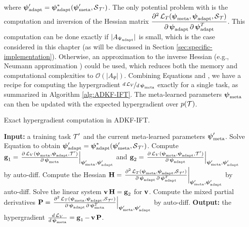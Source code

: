     where $\psiml'=\psiml^*(\psimeta',\support_{\task'})$.
    The only potential problem with 
    is the computation and inversion of the Hessian matrix $\displaystyle \frac{\partial^2\loss_T(\psimeta,\psiml,\support_{\task} )}{\partial\psiml\partial\psiml^T}$.
    This computation can be done exactly if $|A_{\Psiml}|$ is small, which is the case considered in this chapter (as will be discussed in Section \ref{sec:specific-implementation}).
    Otherwise, an approximation to the inverse Hessian (e.g., Neumann approximation \citep{lorraine20a,clarke2022scalable}) could be used, which reduces both the memory and computational complexities to $\mathcal{O}(|A_{\Psi}|)$.
    Combining Equations  and , we have a recipe for computing the hypergradient $\nicefrac{d\loss_V}{d\psimeta}$ exactly for a single task, as summarized in Algorithm \ref{alg:ADKF-IFT}. The meta-learned parameters $\psimeta$ can then be updated with the expected hypergradient over $p(\task)$.
    
    \begin{algorithm}[tbh]
    \small
    \caption{Exact hypergradient computation in ADKF-IFT.}\label{alg:ADKF-IFT}
    \begin{algorithmic}[1]
        \STATE \textbf{Input:} a training task $\task'$ and the current meta-learned parameters $\psimeta'$.
        \vspace{1ex}
        \STATE Solve Equation  to obtain $\psiml'=\psiml^*(\psimeta',\support_{\task'})$.
        \STATE Compute $\bfg_1=\left.\frac{\partial \loss_V(\psimeta,\psiml,\task' )}{\partial\psimeta}\right\vert_{\psimeta',\psiml'}$ and $\bfg_2=\left.\frac{\partial \loss_V(\psimeta,\psiml,\task' )}{\partial \psiml}\right\vert_{\psimeta',\psiml'}$ by auto-diff.
        \STATE Compute the Hessian $\bfH=\left. \frac{\partial^2\loss_T(\psimeta,\psiml,\support_{\task'})}{\partial\psiml\partial\psiml^T}\right\vert_{\psimeta',\psiml'}$ by auto-diff.
        \STATE Solve the linear system $\bfv \bfH=\bfg_2$ for $\bfv$.
        \STATE Compute the mixed partial derivatives $\bfP=\left.\frac{\partial^2\loss_T(\psimeta,\psiml,\support_{\task'} )}{\partial\psiml\partial\psimeta^T}\right\vert_{\psimeta',\psiml'}$ by  auto-diff.
        \STATE \textbf{Output:} the hypergradient $\frac{d\loss_V}{d\psimeta}=\bfg_1-\bfv \bfP$. \hfill{}
        \vspace{1ex}
    \end{algorithmic}
    \end{algorithm}
    
